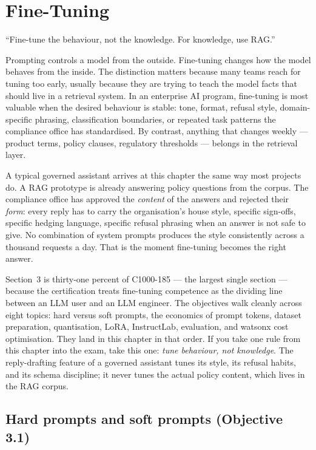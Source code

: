 \chapter{Fine-Tuning}
\label{ch:fine-tuning}

\epigraph{``Fine-tune the behaviour, not the knowledge. For knowledge, use RAG.''}{}

Prompting controls a model from the outside. Fine-tuning changes how the model behaves from the inside. The distinction matters because many teams reach for tuning too early, usually because they are trying to teach the model facts that should live in a retrieval system. In an enterprise AI program, fine-tuning is most valuable when the desired behaviour is stable: tone, format, refusal style, domain-specific phrasing, classification boundaries, or repeated task patterns the compliance office has standardised. By contrast, anything that changes weekly --- product terms, policy clauses, regulatory thresholds --- belongs in the retrieval layer.

A typical governed assistant arrives at this chapter the same way most projects do. A RAG prototype is already answering policy questions from the corpus. The compliance office has approved the \emph{content} of the answers and rejected their \emph{form}: every reply has to carry the organisation's house style, specific sign-offs, specific hedging language, specific refusal phrasing when an answer is not safe to give. No combination of system prompts produces the style consistently across a thousand requests a day. That is the moment fine-tuning becomes the right answer.

Section~3 is thirty-one percent of C1000-185 --- the largest single section --- because the certification treats fine-tuning competence as the dividing line between an LLM user and an LLM engineer. The objectives walk cleanly across eight topics: hard versus soft prompts, the economics of prompt tokens, dataset preparation, quantisation, LoRA, InstructLab, evaluation, and watsonx cost optimisation. They land in this chapter in that order. If you take one rule from this chapter into the exam, take this one: \emph{tune behaviour, not knowledge}. The reply-drafting feature of a governed assistant tunes its style, its refusal habits, and its schema discipline; it never tunes the actual policy content, which lives in the RAG corpus.

\section{Hard prompts and soft prompts (Objective 3.1)}

